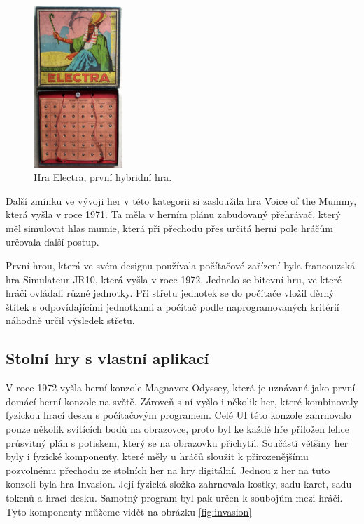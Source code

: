 \begin{figure}[H]
    \centering
    \includegraphics[width=0.3\textwidth]{resources/figures/electra.jpg}
    \caption{Hra Electra, první hybridní hra.\cite{history_of_hybrid_games}}
    \label{fig:electra}
\end{figure}

Další zmínku ve vývoji her v této kategorii si zasloužila hra Voice of the Mummy, která vyšla v roce 1971. Ta měla v herním plánu zabudovaný přehrávač, který měl simulovat hlas mumie, která při přechodu přes určitá herní pole hráčům určovala další postup.\cite{voice_of_the_mummy}

První hrou, která ve svém designu používala počítačové zařízení byla francouzská hra Simulateur JR10, která vyšla v roce 1972. Jednalo se bitevní hru, ve které hráči ovládali různé jednotky. Při střetu jednotek se do počítače vložil děrný štítek s odpovídajícími jednotkami a počítač podle naprogramovaných kritérií náhodně určil výsledek střetu.\cite{simulateur_jr10}

\subsection{Stolní hry s vlastní aplikací}
V roce 1972 vyšla herní konzole Magnavox Odyssey, která je uznávaná jako první domácí herní konzole na světě. Zároveň s ní vyšlo i několik her, které kombinovaly fyzickou hrací desku s počítačovým programem. Celé UI této konzole zahrnovalo pouze několik svítících bodů na obrazovce, proto byl ke každé hře přiložen lehce průsvitný plán s potiskem, který se na obrazovku přichytil. Součástí většiny her byly i fyzické komponenty, které měly u hráčů sloužit k přirozenějšímu pozvolnému přechodu ze stolních her na hry digitální.\cite{magnavox_odyssey} Jednou z her na tuto konzoli byla hra Invasion. Její fyzická složka zahrnovala kostky, sadu karet, sadu tokenů a hrací desku. Samotný program byl pak určen k soubojům mezi hráči. Tyto komponenty můžeme vidět na obrázku \ref{fig:invasion}\cite{invasion,invasion_gameplay}

